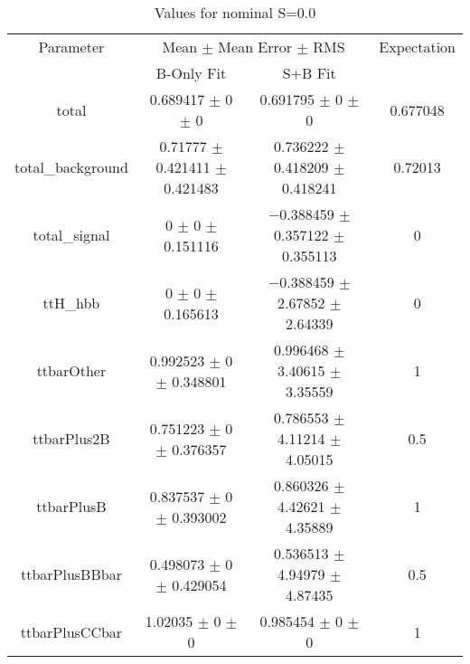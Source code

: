 \begin{table}
\centering
\caption{Values for nominal S=0.0}
\begin{tabular}{cccc}
\toprule
Parameter & \multicolumn{2}{c}{Mean $\pm$ Mean Error $\pm$ RMS} & Expectation\\
 & B-Only Fit & S+B Fit & \\
\midrule
total & \num{0.689417} $\pm$ \num{0} $\pm$ \num{0} & \num{0.691795} $\pm$ \num{0} $\pm$ \num{0} & \num{0.677048}\\
total\_background & \num{0.71777} $\pm$ \num{0.421411} $\pm$ \num{0.421483} & \num{0.736222} $\pm$ \num{0.418209} $\pm$ \num{0.418241} & \num{0.72013}\\
total\_signal & \num{0} $\pm$ \num{0} $\pm$ \num{0.151116} & \num{-0.388459} $\pm$ \num{0.357122} $\pm$ \num{0.355113} & \num{0}\\
ttH\_hbb & \num{0} $\pm$ \num{0} $\pm$ \num{0.165613} & \num{-0.388459} $\pm$ \num{2.67852} $\pm$ \num{2.64339} & \num{0}\\
ttbarOther & \num{0.992523} $\pm$ \num{0} $\pm$ \num{0.348801} & \num{0.996468} $\pm$ \num{3.40615} $\pm$ \num{3.35559} & \num{1}\\
ttbarPlus2B & \num{0.751223} $\pm$ \num{0} $\pm$ \num{0.376357} & \num{0.786553} $\pm$ \num{4.11214} $\pm$ \num{4.05015} & \num{0.5}\\
ttbarPlusB & \num{0.837537} $\pm$ \num{0} $\pm$ \num{0.393002} & \num{0.860326} $\pm$ \num{4.42621} $\pm$ \num{4.35889} & \num{1}\\
ttbarPlusBBbar & \num{0.498073} $\pm$ \num{0} $\pm$ \num{0.429054} & \num{0.536513} $\pm$ \num{4.94979} $\pm$ \num{4.87435} & \num{0.5}\\
ttbarPlusCCbar & \num{1.02035} $\pm$ \num{0} $\pm$ \num{0} & \num{0.985454} $\pm$ \num{0} $\pm$ \num{0} & \num{1}\\
\bottomrule
\end{tabular}
\end{table}
